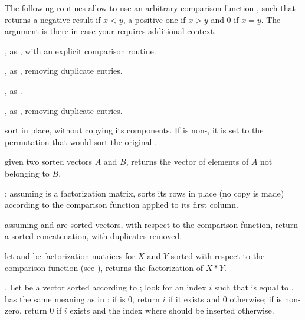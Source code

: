
 The following routines allow to use an
arbitrary comparison function ,
such that  returns a negative result if $x
< y$, a positive one if $x > y$ and 0 if $x = y$. The  argument is
there in case your  requires additional context.

, as
, with an explicit comparison routine.

, as
, removing duplicate entries.

,
as .

,
as , removing duplicate entries.

 sort  in place, without copying its components. If
 is non-, it is set to the permutation that would sort
the original .

 given two sorted
vectors $A$ and $B$, returns the vector of elements of $A$ not belonging to
$B$.

:
assuming  is a factorization matrix, sorts its rows in place (no copy
is made) according to the comparison function  applied to its first
column.

assuming  and  are sorted vectors, with respect to the 
comparison function, return a sorted concatenation, with duplicates removed.

let  and  be factorization matrices for $X$ and $Y$
sorted with respect to the comparison function  (see
), returns the factorization of $X * Y$.

.\hfil\break
Let  be a vector sorted according to ; look for an
index $i$ such that   is equal to .  has the
same meaning as in : if  is 0, return $i$ if it
exists and 0 otherwise; if  is non-zero, return $0$ if $i$ exists
and the index where  should be inserted otherwise.

